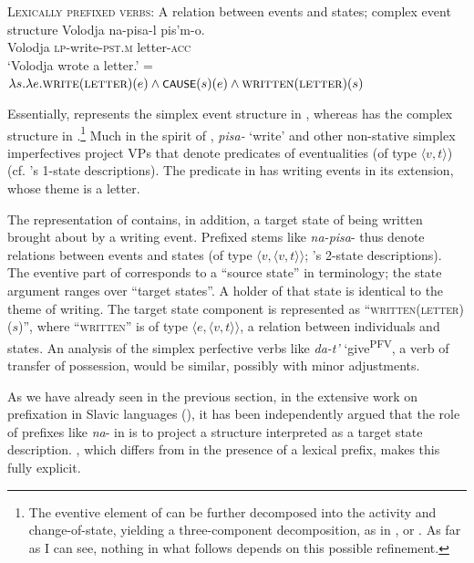 \documentclass[output=paper,colorlinks,citecolor=brown]{langscibook}
\begin{document}
\eanoraggedright   \textsc{Lexically prefixed verbs}: A relation between events and states; complex event structure\label{ex:tatevosov:34}
  \ea
  \gll Volodja  na-pisa-l  pis’m-o.\\
     Volodja  \textsc{lp}-write-\textsc{pst.m}  letter-\textsc{acc}\\
\glt ‘Volodja wrote a letter.’\label{ex:tatevosov:34a}
  \ex     {} = $\lambda s. \lambda e. \textsc{write}(\textsc{letter})(e) \wedge \cnst{cause}(s)(e) \wedge \textsc{written}(\textsc{letter})(s)$\label{ex:tatevosov:34b}
  \z
  \z

\noindent Essentially,  represents the simplex event structure in , whereas  has the complex structure in .\footnote{The eventive element of  can be further decomposed into the activity and change-of-state, yielding a three-component decomposition, as in \citet{paduceva96},  \citet{Ramchand2008} or \citet{BeaversKoontz-Garboden2020}. As far as I can see, nothing in what follows depends on this possible refinement.}  Much in the spirit of \citet{Klein1995}, \textit{pisa-} ‘write’ and other non-stative simplex imperfectives project VPs that denote predicates of eventualities (of type $\langle v, t \rangle$) (cf. \citeauthor{Klein1995}’s 1-state descriptions). The predicate in  has writing events in its extension, whose theme is a letter.

The representation of  contains, in addition, a target state of being written brought about by a writing event. Prefixed stems like \textit{na-pisa}- thus denote relations between events and states (of type $\langle v, \langle v, t \rangle\rangle$; \citeauthor{Klein1995}’s 2-state descriptions). The eventive part of  corresponds to a “source state” in  terminology; the state argument ranges over “target states”. A holder of that state is identical to the theme of writing. The target state component is represented as “\textsc{written}(\textsc{letter})($s$)”, where “\textsc{written}” is of type $\langle e, \langle v, t \rangle\rangle$, a relation between individuals and states. An analysis of the simplex perfective verbs like \textit{da-t’} ‘give\textsuperscript{PFV}, a verb of transfer of possession, would be similar, possibly with minor adjustments.

As we have already seen in the previous section, in the extensive work on prefixation in Slavic languages (\citealt{BabkoMalaya1999,Ramchand2004,Romanova2004,Svenonius2004,Svenonius2008,Arsenijevic2007a,Arsenijevic2007b,Gehrke2008,Tatevosov2009,Tatevosov2013,Zaucer2009,Zaucer2010,Zaucer2013,Biskup2015,Biskup2019}), it has been independently argued that the role of prefixes like \textit{na}- in  is to project a structure interpreted as a target state description. , which differs from  in the presence of a lexical prefix, makes this fully explicit.
\end{document}
